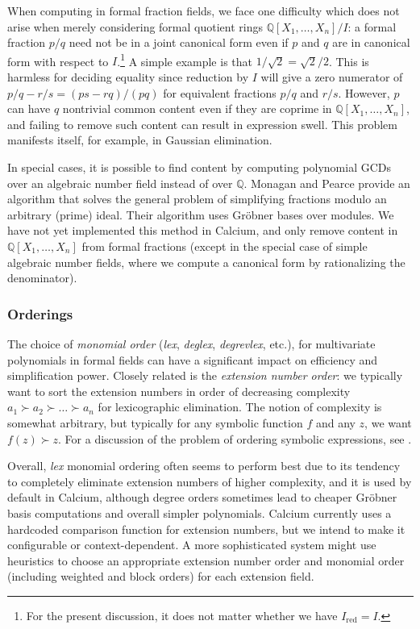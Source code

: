 \documentclass[sigconf,screen,urlbreakonhyphens]{acmart}
\begin{document}
When computing in formal fraction fields,
we face one difficulty
which does not arise when merely considering
formal quotient rings
$\mathbb{Q}[X_1,\ldots,X_n] / I$:
a formal fraction $p / q$ need not be
in a joint canonical form even if $p$ and $q$ are in canonical
form with respect to $I$.\footnote{For the present discussion, it does
not matter whether we have $I_{\text{red}} = I$.}
A simple example is that $1/\sqrt{2} = \sqrt{2}/2$.
This is harmless for deciding equality since
reduction by $I$ will give a zero numerator of
$p / q - r / s = (ps - rq)/(pq)$ for equivalent fractions $p/q$ and $r/s$.
However, $p$ can have $q$ nontrivial
common content
even if they are coprime in $\mathbb{Q}[X_1,\ldots,X_n]$,
and failing to remove such content can result in expression swell.
This problem manifests itself, for example, in Gaussian elimination.

In special cases, it is possible to find
content by computing polynomial GCDs over an algebraic number field
instead of over $\mathbb{Q}$.
Monagan and Pearce \cite{Mon2006} provide
an algorithm that solves the general problem of simplifying
fractions modulo an arbitrary (prime) ideal.
Their algorithm uses Gr\"{o}bner bases over modules.
We have not yet implemented this method in Calcium,
and only remove content in $\mathbb{Q}[X_1,\ldots,X_n]$
from formal fractions
(except in the special case of simple algebraic number fields,
where we compute a canonical form by rationalizing the denominator).

\subsubsection{Orderings}

The choice of \emph{monomial order} (\emph{lex}, \emph{deglex}, \emph{degrevlex}, etc.),
for multivariate polynomials in formal fields
can have a significant impact on efficiency and simplification power.
Closely related is the \emph{extension number order}: we typically
want to sort the extension numbers
in order of decreasing
complexity $a_1 \succ a_2 \succ \ldots \succ a_n$
for lexicographic elimination.
The notion of complexity is somewhat
arbitrary, but typically for any symbolic function $f$ and
any $z$, we want $f(z) \succ z$. For a discussion
of the problem of ordering symbolic expressions, see \cite{Mos1971,Car2004}.

Overall, \emph{lex} monomial ordering often seems to perform best
due to its tendency to completely eliminate extension numbers of higher complexity,
and it is used by default in Calcium,
although degree orders sometimes lead to cheaper
Gr\"{o}bner basis computations and overall simpler polynomials.
Calcium currently uses a hardcoded comparison function for
extension numbers, but we intend
to make it configurable or context-dependent.
A more sophisticated system might use heuristics
to choose an appropriate extension number order and monomial order (including
weighted and block orders) for each extension field.
\end{document}
